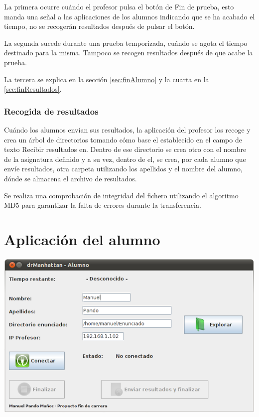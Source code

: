\documentclass[11pt]{article}
\begin{document}
La primera ocurre cuándo el profesor pulsa el botón de Fin de prueba, esto manda una señal a las aplicaciones de los alumnos indicando que se ha acabado el tiempo, no se recogerán resultados después de pulsar el botón.

La segunda sucede durante una prueba temporizada, cuándo se agota el tiempo destinado para la misma. Tampoco se recogen resultados después de que acabe la prueba.

La tercera se explica en la sección \ref{sec:finAlumno} y la cuarta en la \ref{sec:finResultados}.

\subsubsection{Recogida de resultados}

Cuándo los alumnos envían sus resultados, la aplicación del profesor los recoge y crea un árbol de directorios tomando cómo base el establecido en el campo de texto Recibir resultados en. Dentro de ese directorio se crea otro con el nombre de la asignatura definido y a su vez, dentro de el, se crea, por cada alumno que envíe resultados, otra carpeta utilizando los apellidos y el nombre del alumno, dónde se almacena el archivo de resultados.

Se realiza una comprobación de integridad del fichero utilizando el algoritmo MD5 para garantizar la falta de errores durante la transferencia.

\newpage
\section{Aplicación del alumno}

\begin{center}
    \includegraphics[width=.90\linewidth]{imagenes/GUIAlumno}
\end{center}
\end{document}
